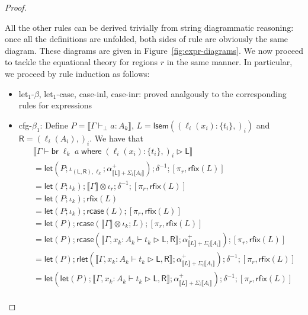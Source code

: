 \documentclass[acmsmall,screen,review]{acmart}
\newcommand{\ms}[1]{\ensuremath{\mathsf{#1}}}
\newcommand{\lto}{:}
\newcommand{\brb}[2]{\ms{br}\;#1\;#2}
\newcommand{\where}[2]{#1\;\ms{where}\;#2}
\newcommand{\wbranch}[3]{#1(#2) \lto \{#3\}}
\newcommand{\bhyp}[2]{#1 : #2}
\newcommand{\hasty}[4]{#1 \vdash_{#2} #3: {#4}}
\newcommand{\haslb}[3]{#1 \vdash #2 \rhd #3}
\newcommand{\brle}[1]{{\textsf{#1}}}
\newcommand{\dnt}[1]{\llbracket{#1}\rrbracket}
\newcommand{\loopmor}[1]{\ms{lsem}(#1)}
\newcommand{\lmor}[1]{\ms{let}(#1)}
\newcommand{\rlmor}[1]{\ms{rlet}(#1)}
\newcommand{\rcase}[1]{\ms{rcase}(#1)}
\newcommand{\rfix}[1]{\ms{rfix}(#1)}
\begin{document}
\begin{proof}
\begin{itemize}[leftmargin=*]
  \end{itemize}
  All the other rules can be derived trivially from string diagrammatic reasoning: once all the
  definitions are unfolded, both sides of rule are obviously the same diagram. These diagrams are
  given in Figure~\ref{fig:expr-diagrams}.
  We now proceed to tackle the equational theory for regions $r$ in the same manner. In particular,
  we proceed by rule induction as follows:
  \begin{itemize}[leftmargin=*]
    \item \brle{let$_1$-$\beta$}, \brle{let$_1$-case}, \brle{case-inl}, \brle{case-inr}: proved
    analgously to the corresponding rules for expressions
    \item \brle{cfg-$\beta_1$}: 
    Define $P = \dnt{\hasty{\Gamma}{\bot}{a}{A_k}}$, %
           $L = \loopmor{(\wbranch{\ell_i}{x_i}{t_i},)_i}$ and %
           $\ms{R} = (\ell_i(A_i),)_i$. %
    We have that
    \begin{equation}
      \begin{aligned}
        & \dnt{\haslb{\Gamma}{\where{\brb{\ell_k}{a}}{(\wbranch{\ell_i}{x_i}{t_i},)_i}}{\ms{L}}} \\
        & = \lmor{
              P ; \iota_{(\ms{L}, \ms{R}), \ell_k} ;
              \alpha^+_{\dnt{\ms{L}} + \Sigma_i \dnt{A_i}}
          } ; \delta^{-1} ; [\pi_r, \rfix{L}] \\
        & = \lmor{P ; \iota_k} ; \dnt{\Gamma} \otimes \iota_r ; \delta^{-1} ; [\pi_r, \rfix{L}] \\
        & = \lmor{P ; \iota_k} ; \rfix{L} \\
        & = \lmor{P ; \iota_k} ; \rcase{L} ; [\pi_r, \rfix{L}] \\
        & = \lmor{P} ; \rcase{\dnt{\Gamma} \otimes \iota_k ; L} ; [\pi_r, \rfix{L}] \\
        & = \lmor{P} 
          ; \rcase{\dnt{\haslb{\Gamma, \bhyp{x_k}{A_k}}{t_k}{\ms{L}, \ms{R}}} 
                    ; \alpha^+_{\dnt{L} + \Sigma_i\dnt{A_i}}} 
          ; [\pi_r, \rfix{L}] \\
        & = \lmor{P} 
          ; \rlmor{\dnt{\haslb{\Gamma, \bhyp{x_k}{A_k}}{t_k}{\ms{L}, \ms{R}}} 
                    ; \alpha^+_{\dnt{L} + \Sigma_i\dnt{A_i}}} 
          ; \delta^{-1}
          ; [\pi_r, \rfix{L}] \\
        & = \lmor{\lmor{P}  
              ; \dnt{\haslb{\Gamma, \bhyp{x_k}{A_k}}{t_k}{\ms{L}, \ms{R}}} 
              ; \alpha^+_{\dnt{L} + \Sigma_i\dnt{A_i}}}
          ; \delta^{-1}
          ; [\pi_r, \rfix{L}] \\

\end{aligned}
\end{equation}
\end{itemize}
\end{proof}
\end{document}
